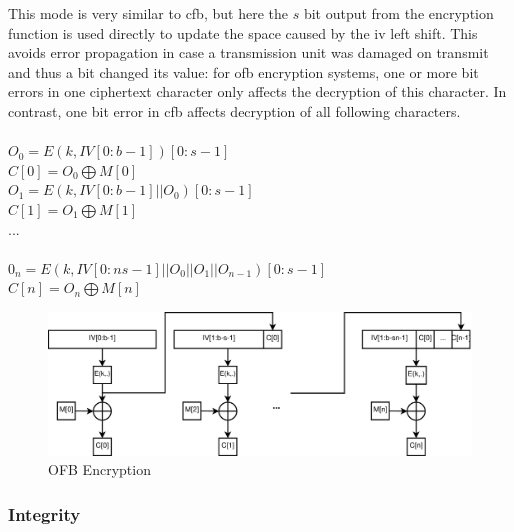 This mode is very similar to \gls{cfb}, but here the $s$ bit output from the encryption function is used directly to update the space caused by the \gls{iv} 
left shift. This avoids error propagation in case a transmission unit was damaged on transmit and thus a bit changed its value:
for \gls{ofb} encryption systems, one or more bit errors in one ciphertext character only affects the decryption of this character. In contrast, one bit error in \gls{cfb} affects
decryption of all following characters.
\\
\\
$O_0 = E(k, IV[0:b-1])[0:s-1]$\\
$C[0] = O_0 \bigoplus M[0]$\\
 $O_1 = E(k, IV[0:b-1] || O_0)[0:s-1]$\\
 $C[1] = O_1 \bigoplus M[1]$\\
 ... \\
 \\
 $0_n = E(k, IV[0:ns-1] || O_0 || O_1 || O_{n-1})[0:s-1]$\\
 $C[n] = O_n \bigoplus M[n]$\\

\begin{figure}
    \centering
    \includegraphics[width=1\textwidth]{figures/OFB.eps}
    \caption{OFB Encryption}
    \label{fig:ofb}
\end{figure}

\subsubsection{Integrity}\label{Integrity}

